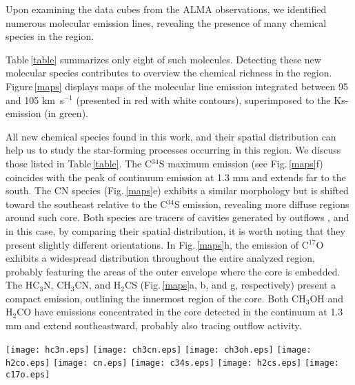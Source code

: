 \documentclass[baaa]{baaa}
\begin{document}
Upon examining the data cubes from the ALMA observations, we identified numerous molecular emission lines, revealing the presence of many chemical species in the region.

Table\,\ref{table} summarizes only eight of such molecules. Detecting these new molecular species contributes to overview the chemical richness in the region. Figure\,\ref{maps} displays maps of the molecular line emission integrated between 95 and 105 km~s$^{-1}$ (presented in red with white contours), superimposed to the Ks-emission (in green).

All new chemical species found in this work, and their spatial distribution can help us to study the star-forming processes occurring in this region. We discuss those listed in Table\,\ref{table}. The C$^{34}$S maximum emission (see Fig.\,\ref{maps}f) coincides with the peak of continuum emission at 1.3 mm and extends far to the south. The CN species (Fig.\,\ref{maps}e) exhibits a similar morphology but is shifted toward the southeast relative to the C$^{34}$S emission, revealing more diffuse regions around such core. Both species are tracers of cavities generated by outflows \citep{ortega23}, and in this case, by comparing their spatial distribution, it is worth noting that they present slightly different orientations.
In Fig.\,\ref{maps}h, the emission of C$^{17}$O exhibits a widespread distribution throughout the entire analyzed region, probably featuring the areas of the outer envelope where the core is embedded. The HC$_{3}$N, CH$_{3}$CN, and H$_{2}$CS (Fig.\,\ref{maps}a, b, and g, respectively) present a compact emission, outlining the innermost region of the core. Both CH$_{3}$OH and H$_{2}$CO have emissions concentrated in the core detected in the continuum at 1.3 mm and extend southeastward, probably also tracing outflow activity.

\begin{figure*}[h!]
\centering
\texttt{[image: hc3n.eps]}
\texttt{[image: ch3cn.eps]}
\texttt{[image: ch3oh.eps]}
\texttt{[image: h2co.eps]}
\texttt{[image: cn.eps]}
\texttt{[image: c34s.eps]} 
\texttt{[image: h2cs.eps]}
\texttt{[image: c17o.eps]}   
\caption{Integrated emission maps of the molecules listed in Table\,\ref{table} (molecular emission in red with white contours) superimposed on the Ks-emission obtained with Gemini-NIRI (green). The molecular lines were integrated between 95 and 105 km s$^{-1}$. In all cases, the first contour represents emission at level of 3$\sigma$. The beam of the molecular observations is included at the bottom right corner of each panel.}
\label{maps}
\end{figure*}
\end{document}
